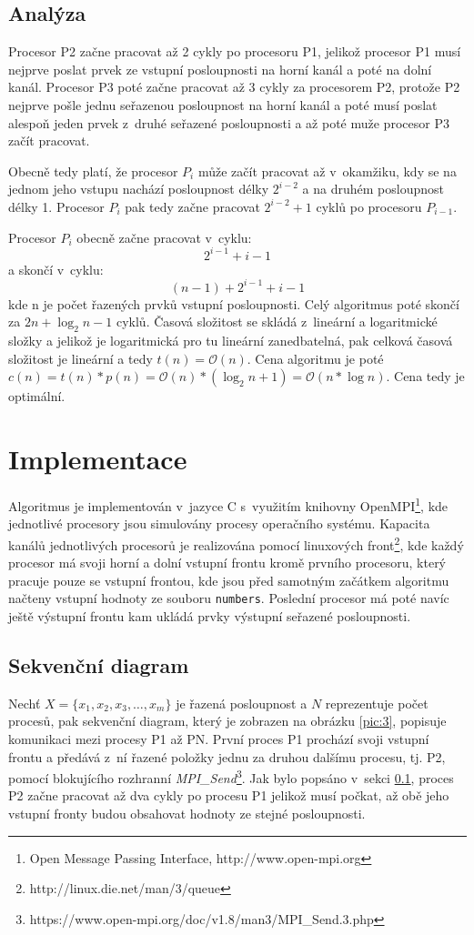 \documentclass[10pt,a4paper,notitlepage]{article}
\newcommand{\bigO}{\ensuremath{\mathcal{O}}}%
\begin{document}
\subsection{Analýza}\label{analyza}
Procesor P2 začne pracovat až 2 cykly po procesoru P1, jelikož procesor P1 musí
nejprve poslat prvek ze vstupní posloupnosti na horní kanál a poté na dolní
kanál. Procesor P3 poté začne pracovat až 3 cykly za procesorem P2, protože P2
nejprve pošle jednu seřazenou posloupnost na horní kanál a poté musí poslat
alespoň jeden prvek z~druhé seřazené posloupnosti a až poté muže procesor P3
začít pracovat.

Obecně tedy platí, že procesor $P_{i}$ může začít pracovat až v~okamžiku, kdy se
na jednom jeho vstupu nachází posloupnost délky $2^{i-2}$ a na druhém posloupnost
délky 1. Procesor $P_{i}$ pak tedy začne pracovat $2^{i-2}+1$ cyklů po procesoru
$P_{i-1}$.

Procesor $P_{i}$ obecně začne pracovat v~cyklu: $$2^{i-1}+i-1$$ a skončí
v~cyklu:
$$(n-1)+2^{i-1}+i-1$$ kde n je počet řazených prvků vstupní posloupnosti.
Celý algoritmus poté skončí za $2n+\log_{2}n-1$ cyklů. Časová složitost se skládá
z~lineární a logaritmické složky a jelikož je logaritmická pro tu lineární
zanedbatelná, pak celková časová složitost je lineární a tedy $t(n) = \bigO(n)$.
Cena algoritmu je poté $c(n) = t(n) * p(n) = \bigO(n) * (\log_{2}n+1) =
\bigO(n*\log{n})$. Cena tedy je optimální.

\section{Implementace}
Algoritmus je implementován v~jazyce C s~využitím knihovny OpenMPI\footnote{Open
Message Passing Interface, http://www.open-mpi.org}, kde jednotlivé procesory jsou
simulovány procesy operačního systému. Kapacita kanálů jednotlivých procesorů je
realizována pomocí linuxových front\footnote{http://linux.die.net/man/3/queue},
kde každý procesor má svoji horní a dolní vstupní frontu kromě prvního
procesoru, který pracuje pouze se vstupní frontou, kde jsou před samotným
začátkem algoritmu načteny vstupní hodnoty ze souboru \texttt{numbers}.
Poslední procesor má poté navíc ještě výstupní frontu kam ukládá prvky výstupní
seřazené posloupnosti.

\subsection{Sekvenční diagram}
Nechť $X=\{x_{1}, x_{2}, x_{3}, \dots, x_{m}\}$ je řazená posloupnost a $N$
reprezentuje počet procesů, pak sekvenční diagram, který je zobrazen na obrázku \ref{pic:3}, popisuje komunikaci
mezi procesy P1 až PN. První proces P1 prochází svoji vstupní frontu a předává z~ní
řazené položky jednu za druhou dalšímu procesu, tj. P2, pomocí blokujícího
rozhranní
\textit{MPI\_Send}\footnote{https://www.open-mpi.org/doc/v1.8/man3/MPI\_Send.3.php}.
Jak bylo popsáno v~sekci \ref{analyza}, proces P2 začne pracovat až dva cykly po
procesu P1 jelikož musí počkat, až obě jeho vstupní fronty budou obsahovat hodnoty
ze stejné posloupnosti.
\end{document}
